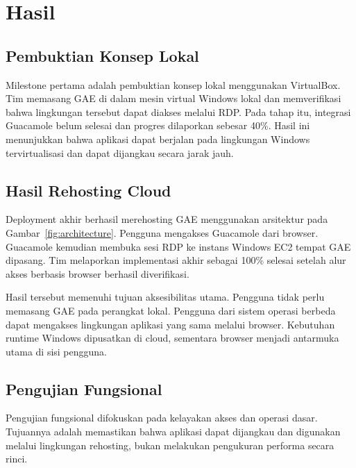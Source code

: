 \documentclass[conference]{IEEEtran}
\begin{document}
\section{Hasil}

\subsection{Pembuktian Konsep Lokal}

Milestone pertama adalah pembuktian konsep lokal menggunakan VirtualBox. Tim memasang GAE di dalam mesin virtual Windows lokal dan memverifikasi bahwa lingkungan tersebut dapat diakses melalui RDP. Pada tahap itu, integrasi Guacamole belum selesai dan progres dilaporkan sebesar 40\%. Hasil ini menunjukkan bahwa aplikasi dapat berjalan pada lingkungan Windows tervirtualisasi dan dapat dijangkau secara jarak jauh.

\subsection{Hasil Rehosting Cloud}

Deployment akhir berhasil merehosting GAE menggunakan arsitektur pada Gambar~\ref{fig:architecture}. Pengguna mengakses Guacamole dari browser. Guacamole kemudian membuka sesi RDP ke instans Windows EC2 tempat GAE dipasang. Tim melaporkan implementasi akhir sebagai 100\% selesai setelah alur akses berbasis browser berhasil diverifikasi.

Hasil tersebut memenuhi tujuan aksesibilitas utama. Pengguna tidak perlu memasang GAE pada perangkat lokal. Pengguna dari sistem operasi berbeda dapat mengakses lingkungan aplikasi yang sama melalui browser. Kebutuhan runtime Windows dipusatkan di cloud, sementara browser menjadi antarmuka utama di sisi pengguna.

\subsection{Pengujian Fungsional}

Pengujian fungsional difokuskan pada kelayakan akses dan operasi dasar. Tujuannya adalah memastikan bahwa aplikasi dapat dijangkau dan digunakan melalui lingkungan rehosting, bukan melakukan pengukuran performa secara rinci.
\end{document}
